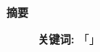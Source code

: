 \begin{center}
    \thispagestyle{empty}
    \fontsize{18pt}{\baselineskip}\bf\textsf{摘\quad 要}
    \vspace{10pt}
\end{center}

\vspace{10pt}




\begin{figure}[h]
    \textbf{关键词:} 「」
\end{figure}